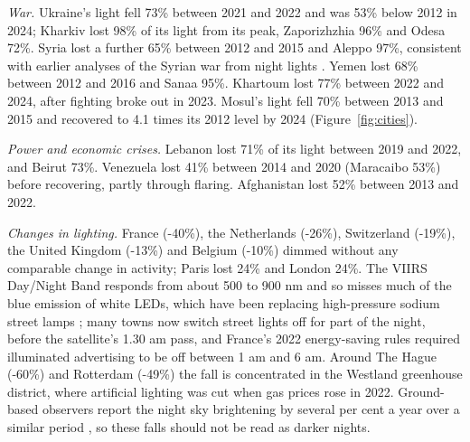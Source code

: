 \documentclass[11pt,a4paper]{article}
\begin{document}
\emph{War.} Ukraine's light fell 73\% between 2021 and 2022 and was 53\% below 2012 in 2024; Kharkiv lost 98\% of its light from its peak, Zaporizhzhia 96\% and Odesa 72\%. Syria lost a further 65\% between 2012 and 2015 and Aleppo 97\%, consistent with earlier analyses of the Syrian war from night lights \citep{li2014}. Yemen lost 68\% between 2012 and 2016 and Sanaa 95\%. Khartoum lost 77\% between 2022 and 2024, after fighting broke out in 2023. Mosul's light fell 70\% between 2013 and 2015 and recovered to 4.1 times its 2012 level by 2024 (Figure~\ref{fig:cities}).

\emph{Power and economic crises.} Lebanon lost 71\% of its light between 2019 and 2022, and Beirut 73\%. Venezuela lost 41\% between 2014 and 2020 (Maracaibo 53\%) before recovering, partly through flaring. Afghanistan lost 52\% between 2013 and 2022.

\emph{Changes in lighting.} France (-40\%), the Netherlands (-26\%), Switzerland (-19\%), the United Kingdom (-13\%) and Belgium (-10\%) dimmed without any comparable change in activity; Paris lost 24\% and London 24\%. The VIIRS Day/Night Band responds from about 500 to 900 nm and so misses much of the blue emission of white LEDs, which have been replacing high-pressure sodium street lamps \citep{kyba2017}; many towns now switch street lights off for part of the night, before the satellite's 1.30 am pass, and France's 2022 energy-saving rules required illuminated advertising to be off between 1 am and 6 am. Around The Hague (-60\%) and Rotterdam (-49\%) the fall is concentrated in the Westland greenhouse district, where artificial lighting was cut when gas prices rose in 2022. Ground-based observers report the night sky brightening by several per cent a year over a similar period \citep{kyba2023}, so these falls should not be read as darker nights.
\end{document}
